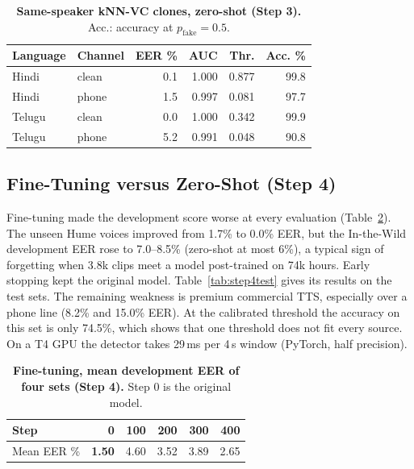 \documentclass[10pt,a4paper,twocolumn]{article}
\begin{document}
\begin{table}[t]
\centering\footnotesize
\caption{\textbf{Same-speaker kNN-VC clones, zero-shot (Step 3).} Acc.: accuracy at $p_{\text{fake}}=0.5$.}
\label{tab:step3}
\begin{tabular}{@{}llrrrr@{}}
\toprule
\textbf{Language} & \textbf{Channel} & \textbf{EER \%} & \textbf{AUC} & \textbf{Thr.} & \textbf{Acc. \%}\\
\midrule
Hindi & clean & 0.1 & 1.000 & 0.877 & 99.8\\
Hindi & phone & 1.5 & 0.997 & 0.081 & 97.7\\
Telugu & clean & 0.0 & 1.000 & 0.342 & 99.9\\
Telugu & phone & 5.2 & 0.991 & 0.048 & 90.8\\
\bottomrule
\end{tabular}
\end{table}

\subsection{Fine-Tuning versus Zero-Shot (Step 4)}
Fine-tuning made the development score worse at every evaluation (Table~\ref{tab:step4dev}). The unseen Hume voices improved from 1.7\% to 0.0\% EER, but the In-the-Wild development EER rose to 7.0--8.5\% (zero-shot at most 6\%), a typical sign of forgetting when 3.8k clips meet a model post-trained on 74k hours. Early stopping kept the original model. Table~\ref{tab:step4test} gives its results on the test sets. The remaining weakness is premium commercial TTS, especially over a phone line (8.2\% and 15.0\% EER). At the calibrated threshold the accuracy on this set is only 74.5\%, which shows that one threshold does not fit every source. On a T4 GPU the detector takes 29\,ms per 4\,s window (PyTorch, half precision).

\begin{table}[t]
\centering\footnotesize
\caption{\textbf{Fine-tuning, mean development EER of four sets (Step 4).} Step 0 is the original model.}
\label{tab:step4dev}
\begin{tabular}{@{}lrrrrr@{}}
\toprule
\textbf{Step} & \textbf{0} & \textbf{100} & \textbf{200} & \textbf{300} & \textbf{400}\\
\midrule
Mean EER \% & \textbf{1.50} & 4.60 & 3.52 & 3.89 & 2.65\\
\bottomrule
\end{tabular}
\end{table}
\end{document}
